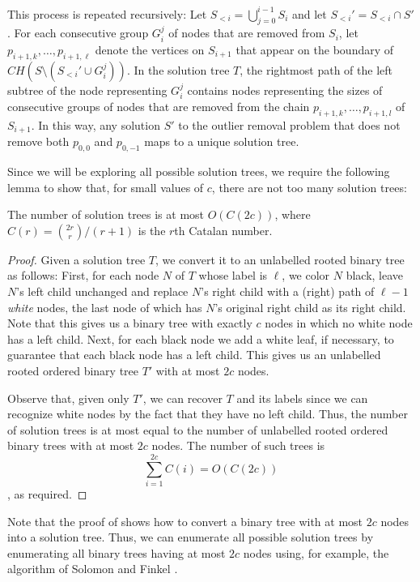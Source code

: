 \documentclass{elsart}
\begin{document}
This process is repeated recursively: Let
$S_{<i}=\bigcup_{j=0}^{i-1}S_i$ and let $S_{<i}'=S_{<i}\cap S'$.  For
each consecutive group $G_i^j$ of nodes that are removed from $S_i$,
let $p_{i+1,k}, \ldots, p_{i+1,\ell}$ denote the vertices on $S_{i+1}$
that appear on the boundary of $CH(S \setminus (S_{<i}'\cup G_i^j))$.
In the solution tree $T$, the rightmost path of the left subtree of
the node representing $G_i^j$ contains nodes representing the sizes of
consecutive groups of nodes that are removed from the chain
$p_{i+1,k}, \ldots, p_{i+1,l}$ of $S_{i+1}$.  In this way, any
solution $S'$ to the outlier removal problem that does not remove both
$p_{0,0}$ and $p_{0,-1}$ maps to a unique solution tree.

Since we will be exploring all possible solution trees, we require the
following lemma to show that, for small values of $c$, there are not
too many solution trees:
 
\begin{lem}
The number of solution trees is at most $O(C(2c))$, where
$C(r)={2r\choose r}/(r+1)$ is the $r$th Catalan number.
\end{lem}

\begin{proof} Given a solution tree $T$, we convert it to an
unlabelled rooted binary tree as follows: First, for each node $N$ of
$T$ whose label is $\ell$, we color $N$ black, leave $N$'s left child
unchanged and replace $N$'s right child with a (right) path of
$\ell-1$ \emph{white} nodes, the last node of which has $N$'s original
right child as its right child.  Note that this gives us a binary tree
with exactly $c$ nodes in which no white node has a left child.  Next,
for each black node we add a white leaf, if necessary, to guarantee
that each black node has a left child.  This gives us an unlabelled
rooted ordered binary tree $T'$ with at most $2c$ nodes.

Observe that, given only $T'$, we can recover $T$ and its labels since
we can recognize white nodes by the fact that they have no left child.
Thus, the number of solution trees is at most equal to the number of
unlabelled rooted ordered binary trees with at most $2c$ nodes.  The
number of such trees is 
\[
  \sum_{i=1}^{2c} C(i) = O(C(2c))
\]
\cite{knuth-graham-patashnik},
as required.
\end{proof}

Note that the proof of  shows how to convert a binary
tree with at most $2c$ nodes into a solution tree.  Thus, we can
enumerate all possible solution trees by enumerating all binary trees
having at most $2c$ nodes using, for example, the algorithm of Solomon
and Finkel \cite{sf80}.
\end{document}
